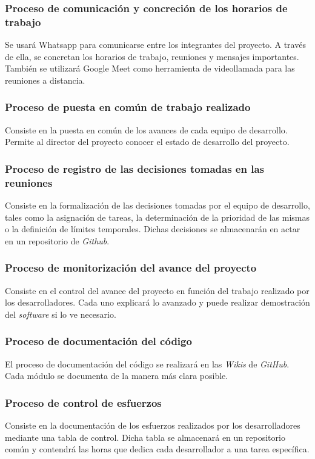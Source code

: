 \documentclass{article}
\begin{document}
\subsubsection{Proceso de comunicación y concreción de los horarios de trabajo} \label{P.EC.1}
Se usará Whatsapp para comunicarse entre los integrantes del proyecto. A través de ella, se concretan los horarios de trabajo, reuniones y mensajes importantes. También se utilizará Google Meet como herramienta de videollamada para las reuniones a distancia. 

\subsubsection{Proceso de puesta en común de trabajo realizado} \label{P.EC.2}
Consiste en la puesta en común de los avances de cada equipo de desarrollo. Permite al director del proyecto conocer el estado de desarrollo del proyecto.

\subsubsection{Proceso de registro de las decisiones tomadas en las reuniones} \label{P.EC.3}
Consiste en la formalización de las decisiones tomadas por el equipo de desarrollo, tales como la asignación de tareas, la determinación de la prioridad de las mismas o la definición de límites temporales. Dichas decisiones se almacenarán en actar en un repositorio de \textit{Github}.

\subsubsection{Proceso de monitorización del avance del proyecto} \label{P.EC.4}
Consiste en el control del avance del proyecto en función del trabajo realizado por los desarrolladores. Cada uno explicará lo avanzado y puede realizar demostración del \textit{software} si lo ve necesario.

\subsubsection{Proceso de documentación del código} \label{P.EC.5}
El proceso de documentación del código se realizará en las \textit{Wikis} de \textit{GitHub}. Cada módulo se documenta de la manera más clara posible.

\subsubsection{Proceso de control de esfuerzos} \label{P.EC.6}
Consiste en la documentación de los esfuerzos realizados por los desarrolladores mediante una tabla de control. Dicha tabla se almacenará en un repositorio común y contendrá las horas que dedica cada desarrollador a una tarea específica.
\end{document}
